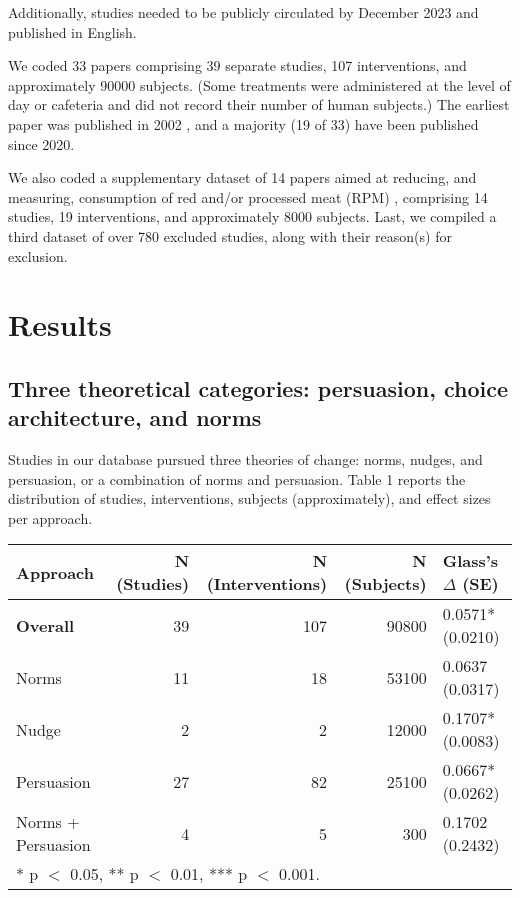 \documentclass[sn-nature,pdflatex]{sn-jnl}
\begin{document}
Additionally, studies needed to be publicly circulated by December 2023
and published in English.

We coded 33 papers
\citep{aldoh2023, allen2002, alblas2023, coker2022, griesoph2021, piester2020, sparkman2017, sparkman2020, andersson2021, kanchanachitra2020, bochmann2017, bschaden2020, cooney2016, feltz2022, haile2021, mathur2021effectiveness, peacock2017, polanco2022, sparkman2021, abrahamse2007, acharya2004, berndsen2005, bertolaso2015, bianchi2022, fehrenbach2015, hatami2018, jalil2023, merrill2009, norris2014, weingarten2022, carfora2023, hennessy2016, mattson2020}
comprising 39 separate studies, 107 interventions, and approximately
90000 subjects. (Some treatments were administered at the level of day
or cafeteria and did not record their number of human subjects.) The
earliest paper was published in 2002 \citep{allen2002}, and a majority
(19 of 33) have been published since 2020.

We also coded a supplementary dataset of 14 papers aimed at reducing,
and measuring, consumption of red and/or processed meat (RPM)
\citep{carfora2017correlational, carfora2017randomised, carfora2019, carfora2019informational, delichatsios2001, dijkstra2022, emmons2005cancer, emmons2005project, jaacks2014, james2015, lee2018, perino2022, schatzkin2000, sorensen2005},
comprising 14 studies, 19 interventions, and approximately 8000
subjects. Last, we compiled a third dataset of over 780 excluded
studies, along with their reason(s) for exclusion.

\section{Results}\label{sec2}

\subsection{Three theoretical categories: persuasion, choice
architecture, and norms}\label{sec2.1}

Studies in our database pursued three theories of change: norms, nudges,
and persuasion, or a combination of norms and persuasion. Table 1
reports the distribution of studies, interventions, subjects
(approximately), and effect sizes per approach.

\begin{table}[!h]
\centering
\begin{tabular}{lrrrl}
\toprule
Approach & N (Studies) & N (Interventions) & N (Subjects) & Glass's $\Delta$ (SE)\\
\midrule
\textbf{Overall} & 39 & 107 & 90800 & 0.0571* (0.0210)\\
Norms & 11 & 18 & 53100 & 0.0637 (0.0317)\\
Nudge & 2 & 2 & 12000 & 0.1707* (0.0083)\\
Persuasion & 27 & 82 & 25100 & 0.0667* (0.0262)\\
Norms + Persuasion & 4 & 5 & 300 & 0.1702 (0.2432)\\
\bottomrule
\multicolumn{5}{l}{\rule{0pt}{1em}* p $<$ 0.05, ** p $<$ 0.01, *** p $<$ 0.001.}\\
\end{tabular}
\end{table}
\end{document}
